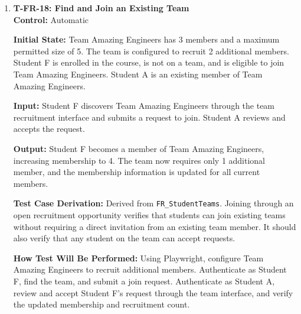 \documentclass[12pt, titlepage]{article}
\begin{document}
\begin{enumerate}
\textbf{Input:} Student E declines the invitation.

\textbf{Output:} The invitation is recorded as declined. Student E is not added to Team Amazing Engineers, and the team's membership count remains 3.

\textbf{Test Case Derivation:} Derived from \texttt{FR\_StudentTeams}. Declining an invitation verifies that students can reject team membership requests without changing existing team composition.

\textbf{How Test Will Be Performed:} Using Playwright, authenticate as Student A and invite Student E. Authenticate as Student E and decline the invitation. Verify that the invitation is no longer pending, Student E remains without a team, and Team Amazing Engineers's member list is unchanged.

\item \label{T-FR-18}\textbf{T-FR-18: Find and Join an Existing Team}\\

\textbf{Control:} Automatic

\textbf{Initial State:} Team Amazing Engineers has 3 members and a maximum permitted size of 5. The team is configured to recruit 2 additional members. Student F is enrolled in the course, is not on a team, and is eligible to join Team Amazing Engineers. Student A is an existing member of Team Amazing
Engineers.

\textbf{Input:} Student F discovers Team Amazing Engineers through the team recruitment interface and submits a request to join. Student A reviews and accepts the request.

\textbf{Output:} Student F becomes a member of Team Amazing Engineers, increasing membership to 4. The team now requires only 1 additional member, and the membership information is updated for all current members.

\textbf{Test Case Derivation:} Derived from \texttt{FR\_StudentTeams}. Joining through an open recruitment opportunity verifies that students can join existing teams without requiring a direct invitation from an existing team member. It should also verify that any student on the team can accept requests.

\textbf{How Test Will Be Performed:} Using Playwright, configure Team Amazing Engineers to recruit additional members. Authenticate as Student F, find the team, and submit a join request. Authenticate as Student A, review and accept Student F's request through the team interface, and verify the updated membership and recruitment count.


\end{enumerate}
\end{document}
